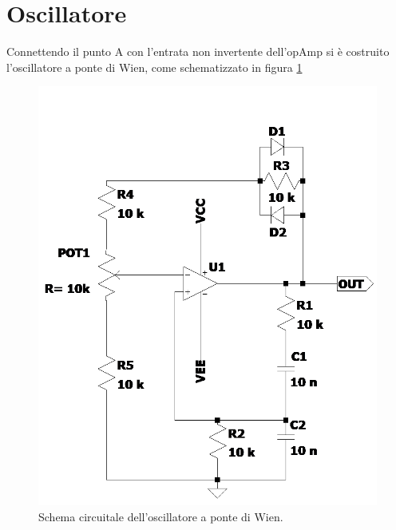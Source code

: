 \documentclass[10pt, a4paper, italian]{article}
\begin{document}
\section{Oscillatore}
Connettendo il punto A con l'entrata non invertente dell'opAmp si è costruito l'oscillatore a ponte di Wien, come schematizzato in figura \cref{fig: Draft2}
\begin{figure}[H]
    \centering
	\includegraphics[scale=0.5]{Draft2}
    \caption{Schema circuitale dell'oscillatore a ponte di Wien.
    \label{fig: Draft2}}
\end{figure}
\end{document}
